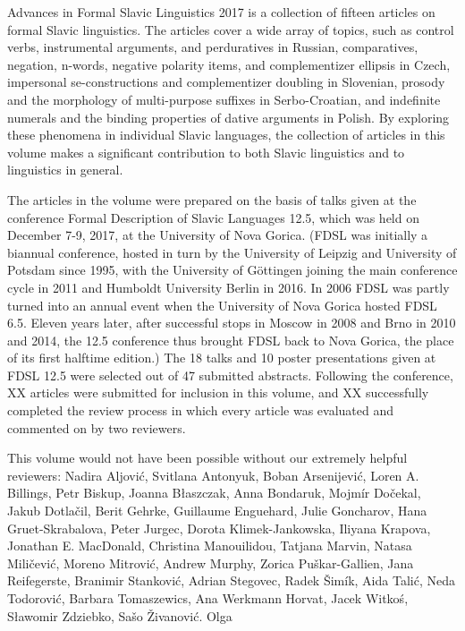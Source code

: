 
Advances in Formal Slavic Linguistics 2017 is a collection of fifteen articles on formal Slavic linguistics. The articles cover a wide array of topics, such as control verbs, instrumental arguments, and perduratives in Russian, comparatives, negation, n-words, negative polarity items, and complementizer ellipsis in Czech, impersonal se-constructions and complementizer doubling in Slovenian, prosody and the morphology of multi-purpose suffixes in Serbo-Croatian, and indefinite numerals and the binding properties of dative arguments in Polish. By exploring these phenomena in individual Slavic languages, the collection of articles in this volume makes a significant contribution to both Slavic linguistics and to linguistics in general.

The articles in the volume were prepared on the basis of talks given at the conference Formal Description of Slavic Languages 12.5, which was held on December 7-9, 2017, at the University of Nova Gorica. (FDSL was initially a biannual conference, hosted in turn by the University of Leipzig and University of Potsdam since 1995, with the University of Göttingen joining the main conference cycle in 2011 and Humboldt University Berlin in 2016. In 2006 FDSL was partly turned into an annual event when the University of Nova Gorica hosted FDSL 6.5. Eleven years later, after successful stops in Moscow in 2008 and Brno in 2010 and 2014, the 12.5 conference thus brought FDSL back to Nova Gorica, the place of its first halftime edition.) The 18 talks and 10 poster presentations given at FDSL 12.5 were selected out of 47 submitted abstracts. Following the conference, XX articles were submitted for inclusion in this volume, and XX successfully completed the review process in which every article was evaluated and commented on by two reviewers.

This volume would not have been possible without our extremely helpful reviewers: Nadira Aljović, Svitlana Antonyuk, Boban Arsenijević, Loren A. Billings, Petr Biskup, Joanna Błaszczak, Anna Bondaruk, Mojmír Dočekal, Jakub Dotlačil, Berit Gehrke, Guillaume Enguehard, Julie Goncharov, Hana Gruet-Skrabalova, Peter Jurgec, Dorota Klimek-Jankowska, Iliyana Krapova, Jonathan E. MacDonald, Christina Manouilidou, Tatjana Marvin, Natasa Miličević, Moreno Mitrović, Andrew Murphy, Zorica Puškar-Gallien, Jana Reifegerste, Branimir Stanković, Adrian Stegovec, Radek Šimík, Aida Talić, Neda Todorović, Barbara Tomaszewics, Ana Werkmann Horvat, Jacek Witkoś, Sławomir Zdziebko, Sašo Živanović. Olga
